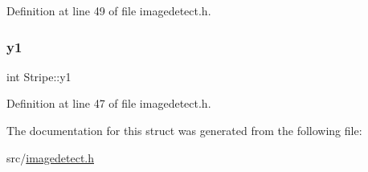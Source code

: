 Definition at line 49 of file imagedetect.\+h.

\mbox{\label{struct_stripe_a91e57d4e64493c1ff6c90944bf9e09e8}} 
\subsubsection{\texorpdfstring{y1}{y1}}
{\footnotesize\ttfamily int Stripe\+::y1}



Definition at line 47 of file imagedetect.\+h.



The documentation for this struct was generated from the following file\+:\begin{DoxyCompactItemize}
\item 
src/\mbox{\hyperlink{imagedetect_8h}{imagedetect.\+h}}\end{DoxyCompactItemize}
